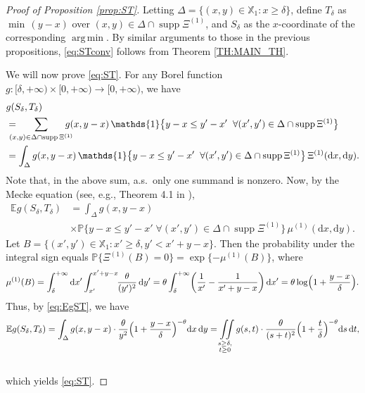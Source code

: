 \documentclass[11pt]{article}
\newcommand{\dd}{\mathrm d}
\newcommand{\X}{\mathbb{X}}
\newcommand{\E}{\mathbb{E}}
\newcommand{\1}[1][]{
	\ifx&#1&\mathds{1}
	\else\mathds{1}\left\{#1\right\}\fi}
\DeclareMathOperator{\supp}{supp}
\DeclareMathOperator*{\argmin}{arg\,min}
\theoremstyle{definition}
\theoremstyle{remark}
\numberwithin{equation}{section}
\begin{document}
	\begin{proof}[Proof of Proposition \ref{prop:ST}]
		Letting 
		$\Delta = \bigl\{(x,y)\in\X_1: x \ge\delta\bigr\}$, define $T_\delta$ as $\min\,(y-x)$ over 
		$(x,y)\in\Delta\cap\supp\Xi^{(1)}$, and $S_\delta$ as the $x$-coordinate of the corresponding $\argmin$. 
		By similar arguments to those in the previous propositions, \eqref{eq:STconv} follows from Theorem \ref{TH:MAIN_TH}.    
			
		We will now prove \eqref{eq:ST}. For any Borel function $g:[\delta,+\infty)\times[0,+\infty)\to[0,+\infty)$, we have
		\begin{align*}
			&g(S_\delta,T_\delta) \\&=\hspace{-10pt}\sum_{(x,y)\in\Delta\cap\supp\Xi^{(1)}}\hspace{-10pt}
			g(x,y-x)\,\mathds{1}\bigl\{
			y-x\le y'-x'\;\;\forall(x',y') \in\Delta\cap\supp\Xi^{(1)}
			\bigr\}\\
			&= \int_\Delta g(x,y-x)\,\mathds{1}\bigl\{
			y-x\le y'-x'\;\;\forall(x',y') \in\Delta\cap\supp\Xi^{(1)}
			\bigr\}\,\Xi^{(1)}(\dd x,\dd y).
		\end{align*}
		Note that, in the above sum, a.s.~only one summand is nonzero. 
		Now, by the Mecke equation (see, e.g., Theorem 4.1 in \cite{LP18}),
		\begin{equation}
			\begin{aligned}
				\label{eq:EgST}
				\E g(S_\delta,T_\delta)&=\int_\Delta g(x,y-x)\,\\&\times\mathbb P
				\bigl\{y-x\le y'-x'\;\forall (x',y')\in\Delta\cap\supp\Xi^{(1)}
				\bigr\}\,\mu^{(1)}(\dd x,\dd y).
			\end{aligned}
		\end{equation}
		Let $B = \{(x',y')\in\X_1: x'\ge\delta, y'<x'+y-x\}$. Then
		the probability under the integral sign equals $\mathbb{P}\{\Xi^{(1)}(B)=0\}=\exp\{-\mu^{(1)}(B)\}$, where
		\begin{equation*}
			\mu^{(1)}(B) = \int_{\delta}^{+\infty}\dd x'\int_{x'}^{x'+y-x}\!\!\frac{\theta}{(y')^2}\,\dd y'
			= \theta\int_\delta^{+\infty}\biggl(\frac{1}{x'} - \frac{1}{x'+y-x}\biggr)\,\dd x'
			= \theta \log\Bigl(1+\frac{y-x}{\delta}\Bigr).
		\end{equation*}
		Thus, by \eqref{eq:EgST}, we have
		\begin{equation*}
			\E g(S_\delta,T_\delta) = \int_{\Delta} g(x,y-x)\cdot\frac{\theta}{y^2} \Bigl(1+\frac{y-x}{\delta}\Bigr)^{-\theta}\dd x\,\dd y
			= \iint\limits_{\substack{s\ge\delta,\\t\ge 0}} g(s,t) \cdot \frac{\theta}{(s+t)^2}\Bigl(1+\frac{t}{\delta}\Bigr)^{-\theta} \dd s\,\dd t,
		\end{equation*}\\[-20pt]
		which yields \eqref{eq:ST}.    
	\end{proof}     
	
\end{document}
